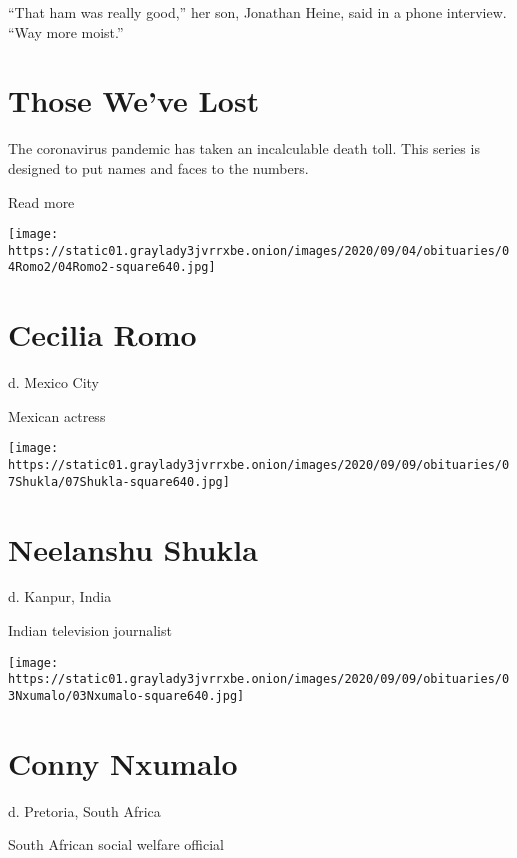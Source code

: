 ``That ham was really good,'' her son, Jonathan Heine, said in a phone
interview. ``Way more moist.''

\href{https://www.nytimes3xbfgragh.onion/interactive/2020/obituaries/people-died-coronavirus-obituaries.html?action=click\&pgtype=Article\&state=default\&region=BELOW_MAIN_CONTENT\&context=covid_obits_promo}{}

\hypertarget{those-weve-lost}{%
\section{Those We've Lost}\label{those-weve-lost}}

The coronavirus pandemic has taken an incalculable death toll. This
series is designed to put names and faces to the numbers.

Read more

\texttt{[image: https://static01.graylady3jvrrxbe.onion/images/2020/09/04/obituaries/04Romo2/04Romo2-square640.jpg]}

\hypertarget{cecilia-romo}{%
\section{Cecilia Romo}\label{cecilia-romo}}

d. Mexico City

Mexican actress

\texttt{[image: https://static01.graylady3jvrrxbe.onion/images/2020/09/09/obituaries/07Shukla/07Shukla-square640.jpg]}

\hypertarget{neelanshu-shukla}{%
\section{Neelanshu Shukla}\label{neelanshu-shukla}}

d. Kanpur, India

Indian television journalist

\texttt{[image: https://static01.graylady3jvrrxbe.onion/images/2020/09/09/obituaries/03Nxumalo/03Nxumalo-square640.jpg]}

\hypertarget{conny-nxumalo}{%
\section{Conny Nxumalo}\label{conny-nxumalo}}

d. Pretoria, South Africa

South African social welfare official

